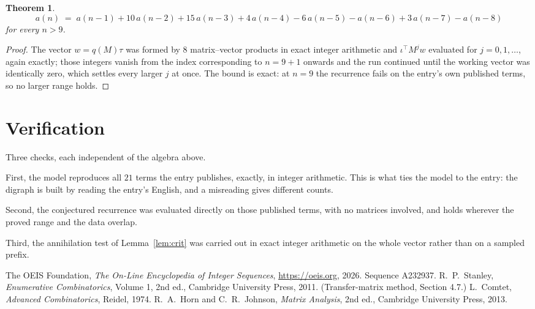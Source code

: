 \documentclass[11pt,a4paper]{article}
\theoremstyle{plain}
\newtheorem{theorem}{Theorem}
\theoremstyle{definition}
\begin{document}
\begin{theorem}
\[
a(n)\;=\;a(n-1) + 10\,a(n-2) + 15\,a(n-3) + 4\,a(n-4) - 6\,a(n-5) - a(n-6) + 3\,a(n-7) - a(n-8)
\]
for every $n>9$.
\end{theorem}

\begin{proof}
The vector $w=q(M)\tau$ was formed by $8$ matrix--vector products in exact integer
arithmetic and $\iota^{\!\top}M^{j}w$ evaluated for $j=0,1,\dots$, again exactly; those
integers vanish from the index corresponding to $n=9+1$ onwards and the run continued
until the working vector was identically zero, which settles every larger $j$ at once. The bound is exact: at $n=9$ the recurrence fails on the entry's own published terms, so no larger range holds.
\end{proof}

\section{Verification}

Three checks, each independent of the algebra above.

First, the model reproduces all $21$ terms the entry publishes, exactly, in integer
arithmetic. This is what ties the model to the entry: the digraph is built by reading the
entry's English, and a misreading gives different counts.

Second, the conjectured recurrence was evaluated directly on those published terms, with no
matrices involved, and holds wherever the proved range and the data overlap.

Third, the annihilation test of Lemma~\ref{lem:crit} was carried out in exact integer
arithmetic on the whole vector rather than on a sampled prefix.

\begin{thebibliography}{9}
 The OEIS Foundation, \emph{The On-Line Encyclopedia of Integer
Sequences}, \url{https://oeis.org}, 2026. Sequence A232937.
 R.~P.~Stanley, \emph{Enumerative Combinatorics}, Volume 1, 2nd ed.,
Cambridge University Press, 2011. (Transfer-matrix method, Section 4.7.)
 L.~Comtet, \emph{Advanced Combinatorics}, Reidel, 1974.
 R.~A.~Horn and C.~R.~Johnson, \emph{Matrix Analysis}, 2nd ed., Cambridge
University Press, 2013.
\end{thebibliography}
\end{document}
